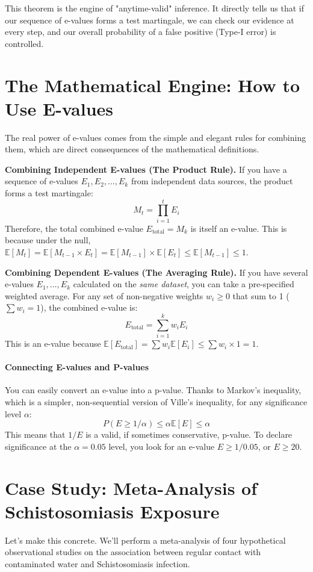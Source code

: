 \documentclass[11pt]{article}
\begin{document}
This theorem is the engine of "anytime-valid" inference. It directly tells us that if our sequence of e-values forms a test martingale, we can check our evidence at every step, and our overall probability of a false positive (Type-I error) is controlled.

\section*{The Mathematical Engine: How to Use E-values}
The real power of e-values comes from the simple and elegant rules for combining them, which are direct consequences of the mathematical definitions.

\begin{theobox}
\textbf{Combining Independent E-values (The Product Rule).}
If you have a sequence of e-values $E_1, E_2, \dots, E_k$ from independent data sources, the product forms a test martingale:
$$ M_t = \prod_{i=1}^t E_i $$
Therefore, the total combined e-value $E_{\text{total}} = M_k$ is itself an e-value. This is because under the null, $\mathbb{E}[M_t] = \mathbb{E}[M_{t-1} \times E_t] = \mathbb{E}[M_{t-1}] \times \mathbb{E}[E_t] \le \mathbb{E}[M_{t-1}] \le 1$.
\end{theobox}

\begin{theobox}
\textbf{Combining Dependent E-values (The Averaging Rule).}
If you have several e-values $E_1, \dots, E_k$ calculated on the \textit{same dataset}, you can take a pre-specified weighted average. For any set of non-negative weights $w_i \ge 0$ that sum to 1 ($\sum w_i = 1$), the combined e-value is:
$$ E_{\text{total}} = \sum_{i=1}^k w_i E_i $$
This is an e-value because $\mathbb{E}[E_{\text{total}}] = \sum w_i \mathbb{E}[E_i] \le \sum w_i \times 1 = 1$.
\end{theobox}

\paragraph{Connecting E-values and P-values}
You can easily convert an e-value into a p-value. Thanks to Markov's inequality, which is a simpler, non-sequential version of Ville's inequality, for any significance level $\alpha$:
$$ P(E \ge 1/\alpha) \le \alpha\mathbb{E}[E] \le \alpha $$
This means that $1/E$ is a valid, if sometimes conservative, p-value. To declare significance at the $\alpha = 0.05$ level, you look for an e-value $E \ge 1/0.05$, or $E \ge 20$.

\section*{Case Study: Meta-Analysis of Schistosomiasis Exposure}
Let's make this concrete. We'll perform a meta-analysis of four hypothetical observational studies on the association between regular contact with contaminated water and Schistosomiasis infection.
\end{document}
